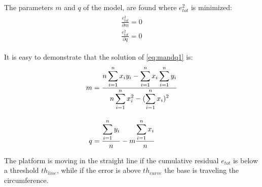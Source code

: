 The parameters $m$ and $q$ of the model, are found where $e_{tot}^2$ is minimized:
\begin{align}
\begin{split}
\frac{e_{tot}^2}{\partial m} = 0\\
\frac{e_{tot}^2}{\partial q} = 0
\end{split}
\label{eq:mandq1}
\end{align}

It is easy to demonstrate that the solution of \ref{eq:mandq1} is:
\begin{align}
\begin{split}
m &= \frac{\displaystyle n\sum_{i=1}^{n}{x_iy_i} - \sum_{i=1}^{n}{x_i}\sum_{i=1}^{n}{y_i}}{\displaystyle n\sum_{i=1}^{n}{x_i^2} -( \sum_{i=1}^{n}{x_i})^2} \\[10pt]
q &= \frac{\displaystyle  \sum_{i=1}^{n}{y_i}}{\displaystyle n} - m\frac{\displaystyle  \sum_{i=1}^{n}{x_i}}{\displaystyle n}
\end{split}
\label{eq:mandq}
\end{align}

The platform is moving in the straight line if the cumulative residual $e_{tot}$ is below a threshold $th_{line}$, while if the error is above $th_{curve}$ the base is traveling the circumference.\\

